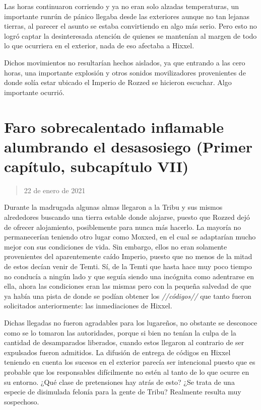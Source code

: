 \documentclass[
  spanish,
]{book}
\begin{document}
Las horas continuaron corriendo y ya no eran solo alzadas temperaturas, un importante runrún de pánico llegaba desde las exteriores aunque no tan lejanas tierras, al parecer el asunto se estaba convirtiendo en algo más serio.
Pero esto no logró captar la desinteresada atención de quienes se mantenían al margen de todo lo que ocurriera en el exterior, nada de eso afectaba a Hixxel.

Dichos movimientos no resultarían hechos aislados, ya que entrando a las cero horas, una importante explosión y otros sonidos movilizadores provenientes de donde solía estar ubicado el Imperio de Rozzed se hicieron escuchar. Algo importante ocurrió.

\hypertarget{faro-sobrecalentado-inflamable-alumbrando-el-desasosiego-primer-capuxedtulo-subcapuxedtulo-vii}{%
\section{Faro sobrecalentado inflamable alumbrando el desasosiego (Primer capítulo, subcapítulo VII)}\label{faro-sobrecalentado-inflamable-alumbrando-el-desasosiego-primer-capuxedtulo-subcapuxedtulo-vii}}

\begin{quote}
22 de enero de 2021
\end{quote}

Durante la madrugada algunas almas llegaron a la Tribu y sus mismos alrededores buscando una tierra estable donde alojarse, puesto que Rozzed dejó de ofrecer alojamiento, posiblemente para nunca más hacerlo. La mayoría no permanecerían teniendo otro lugar como Moxxed, en el cual se adaptarían mucho mejor con sus condiciones de vida.
Sin embargo, ellos no eran solamente provenientes del aparentemente caído Imperio, puesto que no menos de la mitad de estos decían venir de Temti. Sí, de la Temti que hasta hace muy poco tiempo no conducía a ningún lado y que seguía siendo una incógnita como adentrarse en ella, ahora las condiciones eran las mismas pero con la pequeña salvedad de que ya había una pista de donde se podían obtener los \emph{//códigos//} que tanto fueron solicitados anteriormente: las inmediaciones de Hixxel.

Dichas llegadas no fueron agradables para los lugareños, no obstante se desconoce como se lo tomaron las autoridades, porque si bien no tenían la culpa de la cantidad de desamparados liberados, cuando estos llegaron al contrario de ser expulsados fueron admitidos.
La difusión de entrega de códigos en Hixxel teniendo en cuenta los sucesos en el exterior parecía ser intencional puesto que es probable que los responsables difícilmente no estén al tanto de lo que ocurre en su entorno. ¿Qué clase de pretensiones hay atrás de esto? ¿Se trata de una especie de disimulada felonía para la gente de Tribu?
Realmente resulta muy sospechoso.
\end{document}

